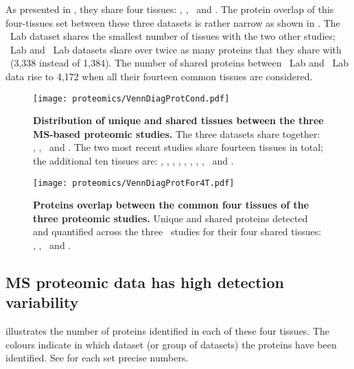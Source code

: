 As presented in ,
they share four tissues: \heart, \lung, \ovary\ and \pancreas.
The protein overlap of this four-tissues set between these three datasets
is rather narrow as shown in .
The \cutler\ Lab dataset shares
the smallest number of tissues with the two other studies;
\pandey\ Lab and \kuster\ Lab datasets share over twice as many proteins
that they share with \cutler\ (3,338 instead of 1,384).
The number of shared proteins between \pandey\ Lab and \kuster\ Lab data rise to 4,172
when all their fourteen common tissues are considered.\mybr\

\begin{figure}[!htb]
    \texttt{[image: proteomics/VennDiagProtCond.pdf]}\centering
    \vspace{-6mm}
    \caption[Distribution of unique shared tissues between
    the 3 MS-based proteomic studies]{\label{fig:VennDiagProt3}\textbf{Distribution
    of unique and shared tissues between the three MS-based proteomic studies.}
    The three datasets share together: \heart, \lung, \ovary\ and \pancreas.
    The two most recent studies share fourteen tissues in total;
    the additional ten tissues are: \adrenal, \hcolon, \gallbladder,
    \oesophagus, \kidney, \liver, \placenta, \prostate, \rectum\ and \testis.}
\end{figure}
\vspace{1.4cm}
\begin{figure}[!htb]
    \texttt{[image: proteomics/VennDiagProtFor4T.pdf]}\centering
    \vspace{-2mm}
    \caption[Proteins overlap between the common tissues of
    the 3 proteomic studies]{\label{fig:VennProtComm}\textbf{Proteins
    overlap between the common four tissues of the three proteomic studies.}
    Unique and shared proteins detected and quantified
    across the three \ms\ studies for their four shared tissues:
    \heart, \lung, \ovary\ and \pancreas.}
\end{figure}
\subsection{MS proteomic data has high detection variability}

illustrates the number of proteins identified in each of these four tissues.
The colours indicate in which dataset (or group of datasets)
the proteins have been identified.
See  for each set precise numbers.\mybr\

